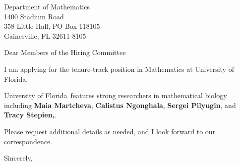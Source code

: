 




	
	
	\def\School{University of Florida}
	
	\begin{letter}
		{Department of Mathematics\\
			1400 Stadium Road\\
			358 Little Hall, PO Box 118105\\
			Gainesville, FL 32611-8105
			
		}
		
		\opening{Dear Members of the Hiring Committee}
		
		
		I am applying for the tenure-track position in Mathematics at \School. 
		
		
		
		\School~features strong researchers in mathematical biology including \textbf{Maia Martcheva}, \textbf{Calistus Ngonghala}, \textbf{Sergei Pilyugin}, and \textbf{Tracy Stepien,}. 
		
		
		
		
		
		Please request additional details as needed, and I look forward to our correspondence.
		
		\closing{Sincerely,}
	\end{letter}
